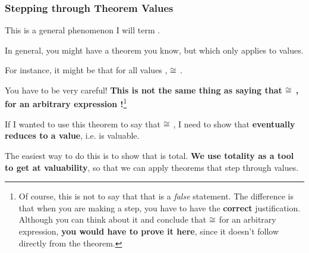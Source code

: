 \documentclass[aspectratio=169, handout]{beamer}
\begin{document}
\begin{frame}[fragile]
  \frametitle{Stepping through Theorem Values}

  This is a general phenomenon I will term .

  \pause
  \vspace{\fill}

  In general, you might have a theorem you know, but which only applies to values.

  \vspace{\fill}

  For instance, it might be that for all values ,  $\cong$
  .

  \pause
  \vspace{\fill}

  You have to be very careful! \textbf{This is not the same thing as saying that
   $\cong$ , for an arbitrary expression !}\footnote{
    Of course, this is not to say that that is a \textit{false} statement.
    The difference is that when you are making a step, you have to have the \textbf{correct}
    justification. Although you can think about it and conclude that  $\cong$ 
    for an arbitrary expression, \textbf{you would have to prove it here}, since it doesn't
    follow directly from the theorem.
  }

  \pause
  \vspace{\fill}

  If I wanted to use this theorem to say that  $\cong$ ,
  I need to show that  \textbf{eventually reduces to a value}, i.e. is valuable.

  \pause
  \vspace{\fill}

  The easiest way to do this is to show that  is total. \textbf{We use totality as
  a tool to get at valuability}, so that we can apply theorems that step through values.
\end{frame}
\end{document}
